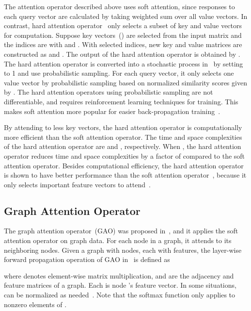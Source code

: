 \documentclass[sigconf]{acmart}
\begin{document}
The attention operator described above uses soft attention, since
responses to each query vector  are calculated by
taking weighted sum over all value vectors. In contrast, hard
attention operator~\cite{xu2015show} only selects a subset of key
and value vectors for computation. Suppose  key vectors~()
are selected from the input matrix  and the indices
are  with  and . With selected indices, new key and value matrices are
constructed as  and . The output of the hard attention operator is obtained by
.
The hard attention operator is converted into a stochastic process
in~\cite{xu2015show} by setting  to 1 and use probabilistic
sampling. For each query vector, it only selects one value vector by
probabilistic sampling based on normalized similarity scores given
by . The hard
attention operators using probabilistic sampling are not
differentiable, and requires reinforcement learning techniques for
training. This makes soft attention more popular for easier
back-propagation training~\cite{ling2017coarse}.

By attending to less key vectors, the hard attention operator is
computationally more efficient than the soft attention operator. The
time and space complexities of the hard attention operator are  and , respectively. When , the hard attention operator reduces time and space complexities
by a factor of  compared to the soft attention operator. Besides
computational efficiency, the hard attention operator is shown to
have better performance than the soft attention
operator~\cite{xu2015show,luong2015effective}, because it only selects
important feature vectors to
attend~\cite{malinowski2018learning,juefei2016deepgender}.

\subsection{Graph Attention Operator}

The graph attention operator~(GAO) was proposed
in~\cite{velivckovic2017graph}, and it applies the soft attention
operator on graph data. For each node in a graph, it attends to its
neighboring nodes. Given a graph with  nodes, each with 
features, the layer-wise forward propagation operation of GAO
in~\cite{velivckovic2017graph} is defined as

where  denotes element-wise matrix multiplication,  and  are the adjacency and
feature matrices of a graph. Each  is node
's feature vector. In some situations,  can be normalized as
needed~\cite{kipf2016semi}. Note that the softmax function only applies to
nonzero elements of .
\end{document}
